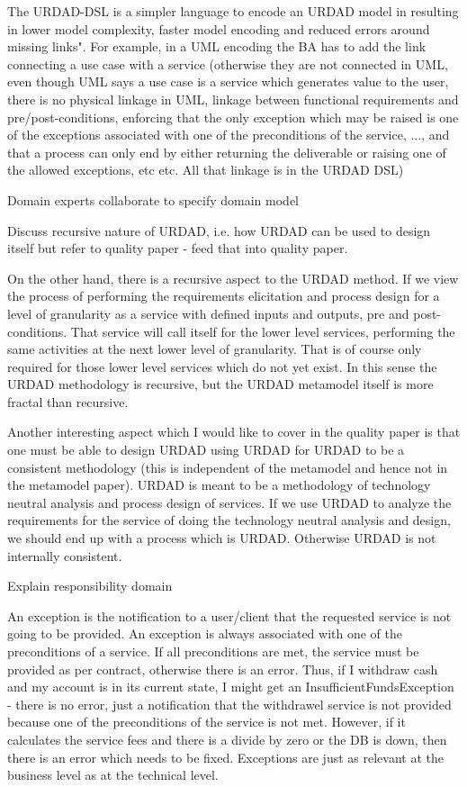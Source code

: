The URDAD-DSL is a simpler language to encode an URDAD model in resulting in lower model complexity, faster model encoding and reduced errors around missing links". For example, in a UML encoding the BA has to add the link connecting a use case with a service (otherwise they are not connected in UML, even though UML says a use case is a service which generates value to the user, there is no physical linkage in UML, linkage between functional requirements and pre/post-conditions, enforcing that the only exception which may be raised is one of the exceptions associated with one of the preconditions of the service, ..., and that a process can only end by either returning the deliverable or raising one of the allowed exceptions, etc etc. All that linkage is in the URDAD DSL)





Domain experts collaborate to specify domain model

Discuss recursive nature of URDAD, i.e. how URDAD can be used to design itself but refer to quality paper - feed that into quality paper.

On the other hand, there is a recursive aspect to the URDAD method. If
we view the process of performing the requirements elicitation and
process design for  a level of granularity as a service with defined
inputs and outputs, pre and post-conditions. That service will call
itself for the lower level services, performing the same activities at
the next lower level of granularity. That is of course only required for
those lower level services which do not yet exist. In this sense the
URDAD methodology is recursive, but the URDAD metamodel itself is more
fractal than recursive.

Another interesting aspect which I would like to cover in the quality
paper is that one must be able to design URDAD using URDAD for URDAD to
be a consistent methodology (this is independent of the metamodel and
hence not in the metamodel paper). URDAD is meant to be a methodology of
technology neutral analysis and process design of services. If we use
URDAD to analyze the requirements for the service of doing the
technology neutral analysis and design, we should end up with a process
which is URDAD. Otherwise URDAD is not internally consistent.


Explain responsibility domain

An exception is the notification to a user/client that the requested service is not going to be provided. An exception is always associated with one of the preconditions of a service. If all preconditions are met, the service must be provided as per contract, otherwise there is an error. Thus, if I withdraw cash and my account is in its current state, I might get an InsufficientFundsException - there is no error, just a notification that the withdrawel service is not provided because one of the preconditions of the service is not met. However, if it calculates the service fees and there is a divide by zero or the DB is down, then there is an error which needs to be fixed. Exceptions are just as relevant at the business level as at the technical level.





